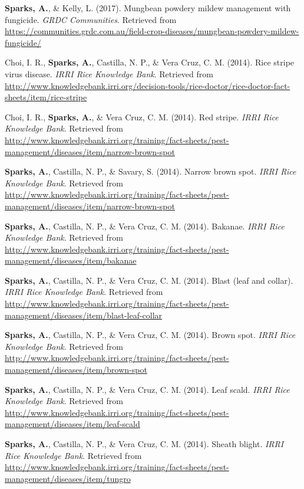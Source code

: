 \documentclass[11pt, a4paper]{awesome-cv}
\begin{document}
\leavevmode\hypertarget{ref-Sparks2017}{}%
\textbf{Sparks, A.}, \& Kelly, L. (2017). Mungbean powdery mildew management with fungicide. \emph{GRDC Communities}. Retrieved from \url{https://communities.grdc.com.au/field-crop-diseases/mungbean-powdery-mildew-fungicide/}

\leavevmode\hypertarget{ref-Choi2014b}{}%
Choi, I. R., \textbf{Sparks, A.}, Castilla, N. P., \& Vera Cruz, C. M. (2014). Rice stripe virus disease. \emph{IRRI Rice Knowledge Bank}. Retrieved from \url{http://www.knowledgebank.irri.org/decision-tools/rice-doctor/rice-doctor-fact-sheets/item/rice-stripe}

\leavevmode\hypertarget{ref-Choi2014}{}%
Choi, I. R., \textbf{Sparks, A.}, \& Vera Cruz, C. M. (2014). Red stripe. \emph{IRRI Rice Knowledge Bank}. Retrieved from \url{http://www.knowledgebank.irri.org/training/fact-sheets/pest-management/diseases/item/narrow-brown-spot}

\leavevmode\hypertarget{ref-Sparks2014f}{}%
\textbf{Sparks, A.}, Castilla, N. P., \& Savary, S. (2014). Narrow brown spot. \emph{IRRI Rice Knowledge Bank}. Retrieved from \url{http://www.knowledgebank.irri.org/training/fact-sheets/pest-management/diseases/item/narrow-brown-spot}

\leavevmode\hypertarget{ref-Sparks2014}{}%
\textbf{Sparks, A.}, Castilla, N. P., \& Vera Cruz, C. M. (2014). Bakanae. \emph{IRRI Rice Knowledge Bank}. Retrieved from \url{http://www.knowledgebank.irri.org/training/fact-sheets/pest-management/diseases/item/bakanae}

\leavevmode\hypertarget{ref-Sparks2014b}{}%
\textbf{Sparks, A.}, Castilla, N. P., \& Vera Cruz, C. M. (2014). Blast (leaf and collar). \emph{IRRI Rice Knowledge Bank}. Retrieved from \url{http://www.knowledgebank.irri.org/training/fact-sheets/pest-management/diseases/item/blast-leaf-collar}

\leavevmode\hypertarget{ref-Sparks2014a}{}%
\textbf{Sparks, A.}, Castilla, N. P., \& Vera Cruz, C. M. (2014). Brown spot. \emph{IRRI Rice Knowledge Bank}. Retrieved from \url{http://www.knowledgebank.irri.org/training/fact-sheets/pest-management/diseases/item/brown-spot}

\leavevmode\hypertarget{ref-Sparks2014e}{}%
\textbf{Sparks, A.}, Castilla, N. P., \& Vera Cruz, C. M. (2014). Leaf scald. \emph{IRRI Rice Knowledge Bank}. Retrieved from \url{http://www.knowledgebank.irri.org/training/fact-sheets/pest-management/diseases/item/leaf-scald}

\leavevmode\hypertarget{ref-Sparks2014c}{}%
\textbf{Sparks, A.}, Castilla, N. P., \& Vera Cruz, C. M. (2014). Sheath blight. \emph{IRRI Rice Knowledge Bank}. Retrieved from \url{http://www.knowledgebank.irri.org/training/fact-sheets/pest-management/diseases/item/tungro}
\end{document}
